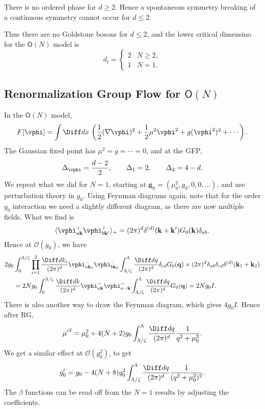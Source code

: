 \documentclass[12pt]{article}
\begin{document}
\begin{theorem}
	There is no ordered phase for $d \geq 2$. Hence a spontaneous symmetry breaking of a continuous symmetry cannot occur for $d \leq 2$.
\end{theorem}

Thus there are no Goldstone bosons for $d \leq 2$, and the lower critical dimensino for the $\mathsf{O}(N)$ model is
\[
d_l =
\begin{cases}
	2 & N \geq 2, \\
	1 & N = 1.
\end{cases}
\]

\subsection{Renormalization Group Flow for \texorpdfstring{$\mathsf{O}(N)$}{O(N)}}%
\label{sub:rgon}

In the $\mathsf{O}(N)$ model,
\[
	F[\vphi] = \int \Diff d x \, \left( \frac 12 (\nabla \vphi)^2 + \frac 12 \mu^2 \vphi^2 + g(\vphi^2)^2 + \cdots \right).
\]
The Gaussian fixed point has $\mu^2 = g = \cdots = 0$, and at the GFP,
\[
\Delta_{\vphi} = \frac{d - 2}{2}, \qquad \Delta_1 = 2, \qquad \Delta_2 = 4 - d.
\]
We repeat what we did for $N = 1$, starting at $\mathbf{g}_0 = (\mu_0^2, g_0, 0, 0, \ldots)$, and use perturbation theory in $g_0$. Using Feynman diagrams again, note that for the order $g_0$ interaction we need a slightly different diagram, as there are now multiple fields. What we find is
\[
\langle \vphi^+_{a \mathbf{k}} \vphi^{+}_{b \mathbf{k}'} \rangle_+ = (2\pi)^d \delta^{(d)}(\mathbf{k} + \mathbf{k}')G_0(\mathbf{k}) \delta_{ab}.
\]
Hence at $\mathcal{O}(g_0)$, we have
\begin{align*}
	2 g_0 & \int_0^{\Lambda/\zeta} \prod_{i = 1}^2 \frac{\Diff d k_i}{(2 \pi)^d} \vphi^{-}_{a \mathbf{k}_1} \vphi^{-}_{b \mathbf{k}_2} \int_{\Lambda/\zeta}^{\Lambda} \frac{\Diff d q}{(2 \pi)^d} \delta_{cd} G_0(\mathbf{q}) \times (2 \pi)^d \delta_{ab} \delta_{cd} \delta^{(d)}(\mathbf{k}_1 + \mathbf{k}_2) \\
	      &= 2 N g_0 \int_0^{\Lambda/\zeta} \frac{\Diff d k}{(2 \pi)^d} \vphi^{-}_{a \mathbf{k}} \vphi^{-}_{a -\mathbf{k}} \int_{\Lambda/\zeta}^{\Lambda} \frac{\Diff d q}{(2 \pi)^d} G_0(\mathbf{q}) = 2 N g_0 I.
\end{align*}
There is also another way to draw the Feynman diagram, which gives $4 g_0 I$. Hence after RG,
\[
	{\mu'}^2 = \mu_0^2 + 4(N + 2)g_0 \int_{\Lambda/\zeta}^{\Lambda} \frac{\Diff d q}{(2 \pi)^d}\frac{1}{q^2 + \mu_0^2}.
\]
We get a similar effect at $\mathcal{O}(g_0^2)$, to get
\[
g_0' = g_0 - 4(N+8) g_0^2 \int_{\Lambda/\zeta}^{\Lambda} \frac{\Diff d q}{(2 \pi)^d} \frac{1}{(q^2+\mu_0^2)^2}.
\]
The $\beta$ functions can be read off from the $N = 1$ results by adjusting the coefficients.
\end{document}
